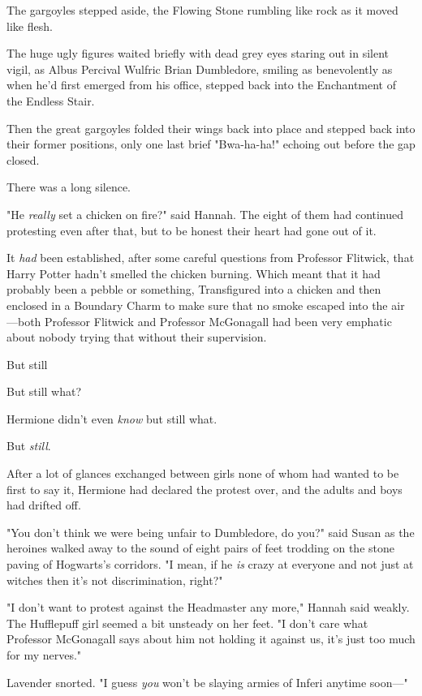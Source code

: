The gargoyles stepped aside, the Flowing Stone rumbling like rock as it moved
like flesh.

The huge ugly figures waited briefly with dead grey eyes staring out in silent
vigil, as Albus Percival Wulfric Brian Dumbledore, smiling as benevolently as
when he'd first emerged from his office, stepped back into the Enchantment of
the Endless Stair.

Then the great gargoyles folded their wings back into place and stepped back
into their former positions, only one last brief "Bwa-ha-ha!" echoing out
before the gap closed.

There was a long silence.

"He \emph{really} set a chicken on fire?" said Hannah.
\sbreak
The eight of them had continued protesting even after that, but to be honest
their heart had gone out of it.

It \emph{had} been established, after some careful questions from Professor
Flitwick, that Harry Potter hadn't smelled the chicken burning. Which meant
that it had probably been a pebble or something, Transfigured into a chicken
and then enclosed in a Boundary Charm to make sure that no smoke escaped into
the air---both Professor Flitwick and Professor McGonagall had been very
emphatic about nobody trying that without their supervision.

But still{\el}

But still{\el} what?

Hermione didn't even \emph{know} but still what.

But \emph{still}.

After a lot of glances exchanged between girls none of whom had wanted to be
first to say it, Hermione had declared the protest over, and the adults and
boys had drifted off.

"You don't think we were being unfair to Dumbledore, do you?" said Susan as the
heroines walked away to the sound of eight pairs of feet trodding on the stone
paving of Hogwarts's corridors. "I mean, if he \emph{is} crazy at everyone and
not just at witches then it's not discrimination, right?"

"I don't want to protest against the Headmaster any more," Hannah said weakly.
The Hufflepuff girl seemed a bit unsteady on her feet. "I don't care what
Professor McGonagall says about him not holding it against us, it's just too
much for my nerves."

Lavender snorted. "I guess \emph{you} won't be slaying armies of Inferi anytime
soon\mbox{---}"

